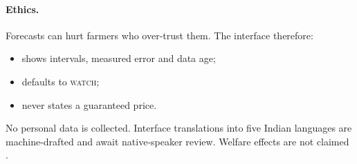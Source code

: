 \paragraph{Ethics.}
Forecasts can hurt farmers who over-trust them. The interface therefore:
\begin{itemize}
  \item shows intervals, measured error and data age;
  \item defaults to \textsc{watch};
  \item never states a guaranteed price.
\end{itemize}
No personal data is collected. Interface translations into five Indian languages are machine-drafted and await native-speaker review. Welfare effects are not claimed \cite{fafchamps2012sms,mitra2018asymmetric}.
